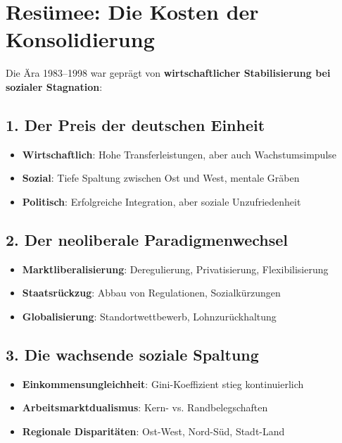 \section{Resümee: Die Kosten der Konsolidierung}

Die Ära 1983–1998 war geprägt von \textbf{wirtschaftlicher Stabilisierung bei sozialer Stagnation}:

\subsection{1. Der Preis der deutschen Einheit}

\begin{itemize}
    \item \textbf{Wirtschaftlich}: Hohe Transferleistungen, aber auch Wachstumsimpulse
    \item \textbf{Sozial}: Tiefe Spaltung zwischen Ost und West, mentale Gräben
    \item \textbf{Politisch}: Erfolgreiche Integration, aber soziale Unzufriedenheit
\end{itemize}

\subsection{2. Der neoliberale Paradigmenwechsel}

\begin{itemize}
    \item \textbf{Marktliberalisierung}: Deregulierung, Privatisierung, Flexibilisierung
    \item \textbf{Staatsrückzug}: Abbau von Regulationen, Sozialkürzungen
    \item \textbf{Globalisierung}: Standortwettbewerb, Lohnzurückhaltung
\end{itemize}

\subsection{3. Die wachsende soziale Spaltung}

\begin{itemize}
    \item \textbf{Einkommensungleichheit}: Gini-Koeffizient stieg kontinuierlich
    \item \textbf{Arbeitsmarktdualismus}: Kern- vs. Randbelegschaften
    \item \textbf{Regionale Disparitäten}: Ost-West, Nord-Süd, Stadt-Land
\end{itemize}

